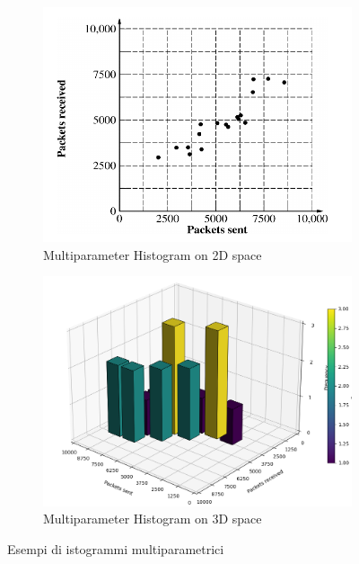 \begin{figure}[h]
\centering

\begin{subfigure}[b]{0.8\textwidth}
\centering
\includegraphics[width=\textwidth]{img/multi-histogram.png}
\caption{Multiparameter Histogram on 2D space}\label{img:multi-histogram}
\end{subfigure}

\hfill

\begin{subfigure}[b]{0.8\textwidth}
\centering
\includegraphics[width=.8\textwidth]{img/multi-histogram-3d.png}
\caption{Multiparameter Histogram on 3D space}
\label{img:multi-histogram-3d}
\end{subfigure}

\caption{Esempi di istogrammi multiparametrici}\label{fig:multi-histograms}
\end{figure}

